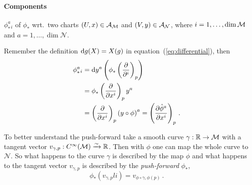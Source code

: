 \paragraph{Components} $\phi_*^a{}_i$ of $\phi_*$ wrt.\ two charts
$(U,x)\in\mathcal{A}_{\mathcal{M}}$ and $(V,y)\in\mathcal{A}_{\mathcal{N}}$,
where $i=1,\ldots,\dim\mathcal{M}$ and $a=1,\ldots,\dim\mathcal{N}$.
\begin{center}
\end{center}
Remember the definition $\operatorname{d\!} g (X) = X(g)$ in equation~(\ref{eq:differential}),
then
\begin{align}
    \nonumber \phi_*^a{}_i &= \operatorname{d\!} y^a \left( \phi_* \left( \frac{\partial}{\partial^i} \right)_p \right)\\
    \label{eq:pushForwardComponents} &= \phi_*\left( \frac{\partial}{\partial x^i} \right)_p y^a\\
    \nonumber &= \left( \frac{\partial}{\partial x^i} \right)_p \left( y\circ\phi \right)^a
    = \left( \frac{\partial \hat{\phi}^a}{\partial x^i} \right)_p\,.
\end{align}
\begin{note}
    To better understand the push-forward take a smooth curve $\gamma: \mathbb{R} \to \mathcal{M}$ 
    with a tangent vector $v_{\gamma, p}: C^\infty(\mathcal{M}) \xrightarrow[]{\sim} \mathbb{R}$.
    Then with $\phi$ one can map the whole curve to $\mathcal{N}$.
    So what happens to the curve $\gamma$ is described by the map $\phi$ and what happens to
    the tangent vector $v_{\gamma, p}$ is  described by the \textit{push-forward}
    $\phi_*$,
    \begin{equation}
        \phi_*(v_{\gamma, p}li) = v_{\phi\circ\gamma, \phi(p)}\,.
    \end{equation}
    \begin{center}
    \end{center}
\end{note}
